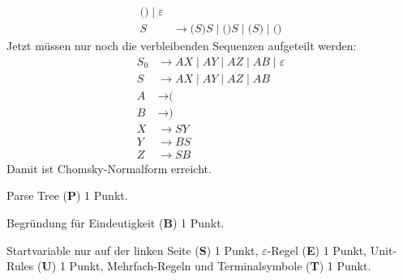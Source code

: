\begin{loesung}
\begin{teilaufgaben}
\begin{align*}
\texttt{(}  \texttt{)} 
\;|\;
\varepsilon
\\
S&\rightarrow
\texttt{(} S \texttt{)} S \;|\;
\texttt{(}  \texttt{)} S \;|\;
\texttt{(} S \texttt{)}  \;|\;
\texttt{(}  \texttt{)} 
\end{align*}
Jetzt müssen nur noch die verbleibenden Sequenzen aufgeteilt werden:
\begin{align*}
S_0&\rightarrow
AX \;|\;
AY \;|\;
AZ  \;|\;
AB 
\;|\;
\varepsilon
\\
S&\rightarrow
AX \;|\;
AY \;|\;
AZ  \;|\;
AB 
\\
A&\rightarrow \texttt{(}\\
B&\rightarrow \texttt{)}\\
X&\rightarrow SY \\
Y&\rightarrow BS \\
Z&\rightarrow SB
\end{align*}
Damit ist Chomsky-Normalform erreicht.
\qedhere
\end{teilaufgaben}
\end{loesung}

\begin{bewertung}
\begin{teilaufgaben}
\item
Parse Tree ({\bf P}) 1 Punkt.
\item
Begründung für Eindeutigkeit ({\bf B})  1 Punkt.
\item
Startvariable nur auf der linken Seite ({\bf S}) 1 Punkt,
$\varepsilon$-Regel ({\bf E}) 1 Punkt,
Unit-Rules ({\bf U}) 1 Punkt,
Mehrfach-Regeln und Terminalsymbole ({\bf T}) 1 Punkt.
\end{teilaufgaben}
\end{bewertung}




